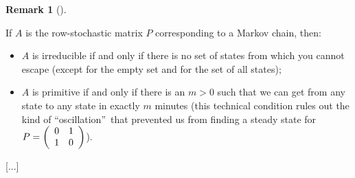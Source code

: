 \documentclass[numbers=enddot,12pt,final,onecolumn,notitlepage]{scrartcl}%
\numberwithin{exer}{subsection}
\theoremstyle{definition}
\newtheorem{remk}[theo]{Remark}
\newenvironment{remark}[1][]
{\begin{remk}[#1]\begin{leftbar}}
{\end{leftbar}\end{remk}}
\begin{document}
\begin{remark}
If $A$ is the row-stochastic matrix $P$ corresponding to a Markov chain, then:

\begin{itemize}
\item $A$ is irreducible if and only if there is no set of states from which
you cannot escape (except for the empty set and for the set of all states);

\item $A$ is primitive if and only if there is an $m>0$ such that we can get
from any state to any state in exactly $m$ minutes (this technical condition
rules out the kind of \textquotedblleft oscillation\textquotedblright\ that
prevented us from finding a steady state for $P=\left(
\begin{array}
[c]{cc}%
0 & 1\\
1 & 0
\end{array}
\right)  $).
\end{itemize}
\end{remark}

[...]

\newpage
\end{document}
